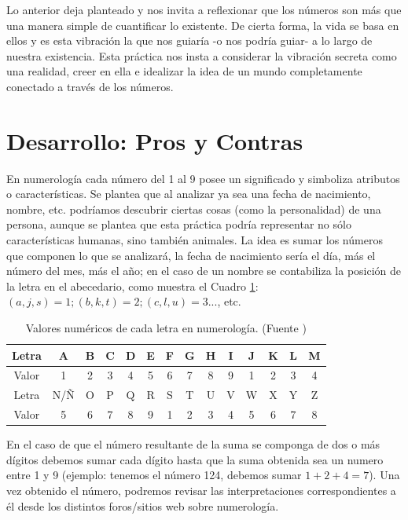 \documentclass{article}
\begin{document}
	Lo anterior deja planteado y nos invita a reflexionar que los números son más que una manera simple de cuantificar lo existente. De cierta forma, la vida se basa en ellos y es esta vibración la que nos guiaría -o nos podría guiar- a lo largo de nuestra existencia. Esta práctica nos insta a considerar la vibración secreta como una realidad, creer en ella e idealizar la idea de un mundo completamente conectado a través de los números.
	
	\section*{Desarrollo: Pros y Contras}
	
	En numerología cada número del 1 al 9 posee un significado y simboliza atributos o características. Se plantea que al analizar ya sea una fecha de nacimiento, nombre, etc. podríamos descubrir ciertas cosas (como la personalidad) de una persona, aunque se plantea que esta práctica podría representar no sólo características humanas, sino también animales. La idea es sumar los números que componen lo que se analizará, la fecha de nacimiento sería el día, más el número del mes, más el año; en el caso de un nombre se contabiliza la posición de la letra en el abecedario, como muestra el Cuadro \ref{tab1}: $(a, j, s)=1; (b, k, t)=2; (c, l, u)=3...$, etc.\cite{ochoa}\\
	
	\begin{table}[htbp] %
		\centering
		\begin{tabular}{|c|c|c|c|c|c|c|c|c|c|c|c|c|c|}
			\hline
			Letra & A & B & C & D & E & F & G & H & I & J & K & L & M \\\hline
			Valor & 1 & 2 & 3 & 4 & 5 & 6 & 7 & 8 & 9 & 1 & 2 & 3 & 4 \\\hline\hline
			Letra & N/Ñ & O & P & Q & R & S & T & U & V & W & X & Y & Z \\\hline
			Valor & 5 & 6 & 7 & 8 & 9 & 1 & 2 & 3 & 4 & 5 & 6 & 7 & 8 \\\hline
		\end{tabular}
		\caption{\label{tab1} Valores numéricos de cada letra en numerología. (Fuente \cite{ochoa})}
	\end{table}
	
	En el caso de que el número resultante de la suma se componga de dos o más dígitos debemos sumar cada dígito hasta que la suma obtenida sea un numero entre 1 y 9 (ejemplo: tenemos el número 124, debemos sumar $1+2+4=7$). Una vez obtenido el número, podremos revisar las interpretaciones correspondientes a él desde los distintos foros/sitios web sobre numerología.\\
	
\end{document}
